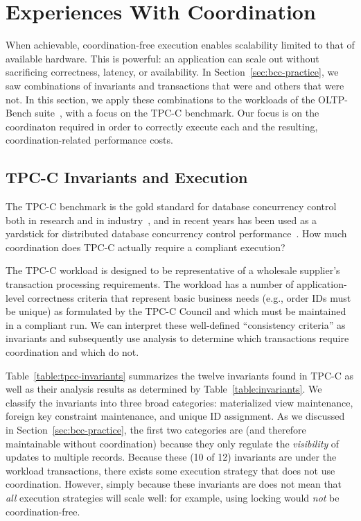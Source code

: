 
\section{Experiences With Coordination}
\label{sec:evaluation}

When achievable, coordination-free execution enables scalability
limited to that of available hardware. This is powerful: an
\iconfluent application can scale out without
sacrificing correctness, latency, or availability. In
Section~\ref{sec:bcc-practice}, we saw combinations of invariants
and transactions that were \iconfluent and others that were not. In this
section, we apply these combinations to the workloads of the
OLTP-Bench suite~\cite{oltpbench}, with a focus on the TPC-C
benchmark. Our focus is on the coordinaton required in order to
correctly execute each and the resulting, coordination-related
performance costs.

\subsection{TPC-C Invariants and Execution}
\label{sec:tpcc-invariants}

The TPC-C benchmark is the gold standard for database concurrency
control~\cite{oltpbench} both in research and in industry~\cite{tpcc},
and in recent years has been used as a yardstick for distributed
database concurrency control
performance~\cite{calvin,hstore,silo}. How much coordination does
TPC-C actually require a compliant execution?

The TPC-C workload is designed to be representative of a wholesale
supplier's transaction processing requirements. The workload has a number of
application-level correctness criteria that represent basic business
needs (e.g., order IDs must be unique) as formulated by the TPC-C
Council and which must be maintained in a compliant run. We can
interpret these well-defined ``consistency criteria'' as invariants and
subsequently use \iconfluence analysis to determine which transactions
require coordination and which do not.

Table~\ref{table:tpcc-invariants} summarizes the twelve invariants
found in TPC-C as well as their \iconfluence analysis results as
determined by Table~\ref{table:invariants}. We classify the invariants
into three broad categories: materialized view maintenance, foreign
key constraint maintenance, and unique ID assignment. As we discussed
in Section~\ref{sec:bcc-practice}, the first two categories are
\iconfluent (and therefore maintainable without coordination) because
they only regulate the \textit{visibility} of updates to multiple
records. Because these (10 of 12) invariants are \iconfluent under the
workload transactions, there exists some execution strategy that does
not use coordination. However, simply because these invariants are
\iconfluent does not mean that \textit{all} execution strategies will
scale well: for example, using locking would \textit{not} be
coordination-free.


